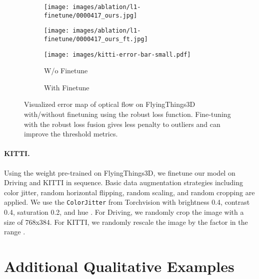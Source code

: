 \documentclass[10pt,twocolumn,letterpaper]{article}
\begin{document}
\begin{figure}[t]
    \begin{subfigure}[b]{0.499\linewidth}
        \texttt{[image: images/ablation/l1-finetune/0000417\_ours.jpg]}
    \end{subfigure}\hfill
    \begin{subfigure}[b]{0.499\linewidth}
        \texttt{[image: images/ablation/l1-finetune/0000417\_ours\_ft.jpg]}
    \end{subfigure}

    \vspace{-4.5pt}
    \begin{subfigure}[b]{\linewidth}
        \texttt{[image: images/kitti-error-bar-small.pdf]}
    \end{subfigure}\vspace{3pt}

    \begin{subfigure}[b]{0.499\linewidth}
        \caption{W/o Finetune}
    \end{subfigure}\hfill
    \begin{subfigure}[b]{0.499\linewidth}
        \caption{With Finetune}
    \end{subfigure}

    \vspace{-5pt}
    \caption{Visualized error map of optical flow on FlyingThings3D with/without finetuning using the robust loss function. Fine-tuning with the robust loss fusion gives less penalty to outliers and can improve the threshold metrics.}
    \vspace{-5pt}

    \label{fig:things-finetune}
\end{figure}

\paragraph{KITTI.} Using the weight pre-trained on FlyingThings3D, we finetune our model on Driving and KITTI in sequence. Basic data augmentation strategies including color jitter, random horizontal flipping, random scaling, and random cropping are applied. We use the \texttt{ColorJitter} from Torchvision \cite{paszke2019pytorch} with brightness 0.4, contrast 0.4, saturation 0.2, and hue . For Driving, we randomly crop the image with a size of 768x384. For KITTI, we randomly rescale the image by the factor in the range .

\section{Additional Qualitative Examples}
\end{document}
